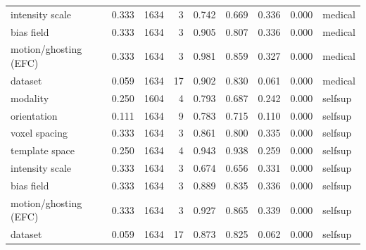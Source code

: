 \begin{tabular}{lrrrrrrrl}
intensity scale & 0.333 & 1634 & 3 & 0.742 & 0.669 & 0.336 & 0.000 & medical \\
bias field & 0.333 & 1634 & 3 & 0.905 & 0.807 & 0.336 & 0.000 & medical \\
motion/ghosting (EFC) & 0.333 & 1634 & 3 & 0.981 & 0.859 & 0.327 & 0.000 & medical \\
dataset & 0.059 & 1634 & 17 & 0.902 & 0.830 & 0.061 & 0.000 & medical \\
modality & 0.250 & 1604 & 4 & 0.793 & 0.687 & 0.242 & 0.000 & selfsup \\
orientation & 0.111 & 1634 & 9 & 0.783 & 0.715 & 0.110 & 0.000 & selfsup \\
voxel spacing & 0.333 & 1634 & 3 & 0.861 & 0.800 & 0.335 & 0.000 & selfsup \\
template space & 0.250 & 1634 & 4 & 0.943 & 0.938 & 0.259 & 0.000 & selfsup \\
intensity scale & 0.333 & 1634 & 3 & 0.674 & 0.656 & 0.331 & 0.000 & selfsup \\
bias field & 0.333 & 1634 & 3 & 0.889 & 0.835 & 0.336 & 0.000 & selfsup \\
motion/ghosting (EFC) & 0.333 & 1634 & 3 & 0.927 & 0.865 & 0.339 & 0.000 & selfsup \\
dataset & 0.059 & 1634 & 17 & 0.873 & 0.825 & 0.062 & 0.000 & selfsup \\
\bottomrule
\end{tabular}
